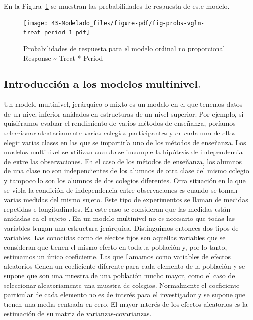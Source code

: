 \documentclass[
  12pt,
  a4paper,
  extrafontsizes,
  onecolumn,
  openright]{memoir}
\begin{document}
\normalsize

En la Figura~\ref{fig-probs-vglm-treat.period} se muestran las
probabilidades de respuesta de este modelo.

\begin{figure}[h]

{\centering \texttt{[image: 43-Modelado\_files/figure-pdf/fig-probs-vglm-treat.period-1.pdf]}

}

\caption{\label{fig-probs-vglm-treat.period}Probabilidades de respuesta
para el modelo ordinal no proporcional Response \textasciitilde{} Treat
* Period}

\end{figure}

\hypertarget{introducciuxf3n-a-los-modelos-multinivel.}{%
\subsection{Introducción a los modelos
multinivel.}\label{introducciuxf3n-a-los-modelos-multinivel.}}

Un modelo multinivel, jerárquico o mixto es un modelo en el que tenemos
datos de un nivel inferior anidados en estructuras de un nivel superior.
Por ejemplo, si quisiéramos evaluar el rendimiento de varios métodos de
enseñanza, poríamos seleccionar aleatoriamente varios colegios
participantes y en cada uno de ellos elegir varias clases en las que se
impartiría uno de los métodos de enseñanza. Los modelos multinivel se
utilizan cuando se incumple la hipótesis de independencia de entre las
observaciones. En el caso de los métodos de enseñanza, los alumnos de
una clase no son independientes de los alumnos de otra clase del mismo
colegio y tampoco lo son los alumnos de dos colegios diferentes. Otra
situación en la que se viola la condición de independencia entre
observaciones es cuando se toman varias medidas del mismo sujeto. Este
tipo de experimentos se llaman de medidas repetidas o longitudinales. En
este caso se consideran que las medidas están anidadas en el sujeto
\autocite[ver][]{Liu2202}. En un modelo multinivel no es necesario que
todas las variables tengan una estructura jerárquica. Distinguimos
entonces dos tipos de variables. Las conocidas como de efectos fijos son
aquellas variables que se consideran que tienen el mismo efecto en toda
la población y, por lo tanto, estimamos un único coeficiente. Las que
llamamos como variables de efectos aleatorios tienen un coeficiente
diferente para cada elemento de la población y se supone que son una
muestra de una población mucho mayor, como el caso de seleccionar
aleatoriamente una muestra de colegios. Normalmente el coeficiente
particular de cada elemento no es de interés para el investigador y se
supone que tienen una media centrada en cero. El mayor interés de los
efectos aleatorios es la estimación de su matriz de
varianzas-covarianzas.
\end{document}
